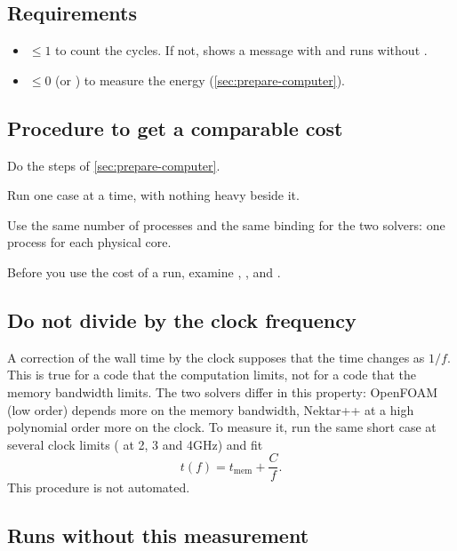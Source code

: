 \subsection{Requirements}

\begin{itemize}
\item {} $\leq 1$ to count the cycles. If not,
   shows a message with \val{!!} and runs without .
\item $\leq 0$ (or ) to measure the energy (\cref{sec:prepare-computer}).
\end{itemize}

\subsection{Procedure to get a comparable cost}

\begin{steps}
\item Do the steps of \cref{sec:prepare-computer}.
\item Run one case at a time, with nothing heavy beside it.
\item Use the same number of processes and the same binding for the two solvers: one
  process for each physical core.
\item Before you use the cost of a run, examine ,
  ,  and .
\end{steps}

\subsection{Do not divide by the clock frequency}

A correction of the wall time by the clock supposes that the time changes as $1/f$.
This is true for a code that the computation limits, not for a code that the memory
bandwidth limits. The two solvers differ in this property: OpenFOAM (low order)
depends more on the memory bandwidth, Nektar++ at a high polynomial order more on the
clock. To measure it, run the same short case at several clock limits
( at 2, 3 and \unit{4}{GHz}) and fit
\[
  t(f) = t_\text{mem} + \frac{C}{f}.
\]
This procedure is not automated.

\subsection{Runs without this measurement}

